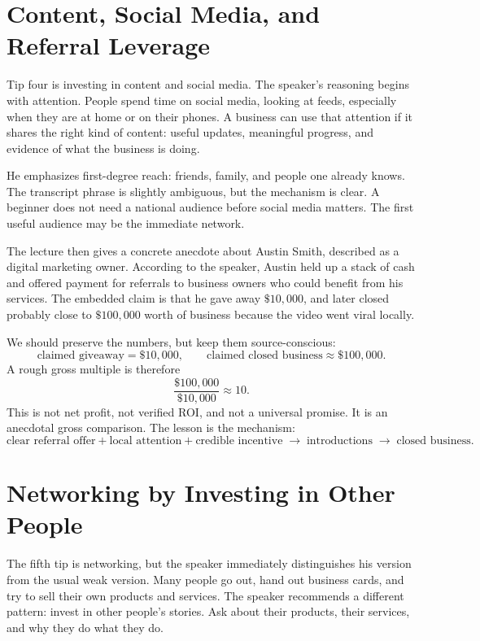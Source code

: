 \section{Content, Social Media, and Referral Leverage}

Tip four is investing in content and social media. The speaker's reasoning begins with attention. People spend time on social media, looking at feeds, especially when they are at home or on their phones. A business can use that attention if it shares the right kind of content: useful updates, meaningful progress, and evidence of what the business is doing.

He emphasizes first-degree reach: friends, family, and people one already knows. The transcript phrase is slightly ambiguous, but the mechanism is clear. A beginner does not need a national audience before social media matters. The first useful audience may be the immediate network.

The lecture then gives a concrete anecdote about Austin Smith, described as a digital marketing owner. According to the speaker, Austin held up a stack of cash and offered payment for referrals to business owners who could benefit from his services. The embedded claim is that he gave away \(\$10{,}000\), and later closed probably close to \(\$100{,}000\) worth of business because the video went viral locally.

We should preserve the numbers, but keep them source-conscious:
\[
\text{claimed giveaway} = \$10{,}000,
\qquad
\text{claimed closed business} \approx \$100{,}000.
\]
A rough gross multiple is therefore
\[
\frac{\$100{,}000}{\$10{,}000} \approx 10.
\]
This is not net profit, not verified ROI, and not a universal promise. It is an anecdotal gross comparison. The lesson is the mechanism:
\[
\text{clear referral offer}
+
\text{local attention}
+
\text{credible incentive}
\;\longrightarrow\;
\text{introductions}
\;\longrightarrow\;
\text{closed business}.
\]

\section{Networking by Investing in Other People}

The fifth tip is networking, but the speaker immediately distinguishes his version from the usual weak version. Many people go out, hand out business cards, and try to sell their own products and services. The speaker recommends a different pattern: invest in other people's stories. Ask about their products, their services, and why they do what they do.

